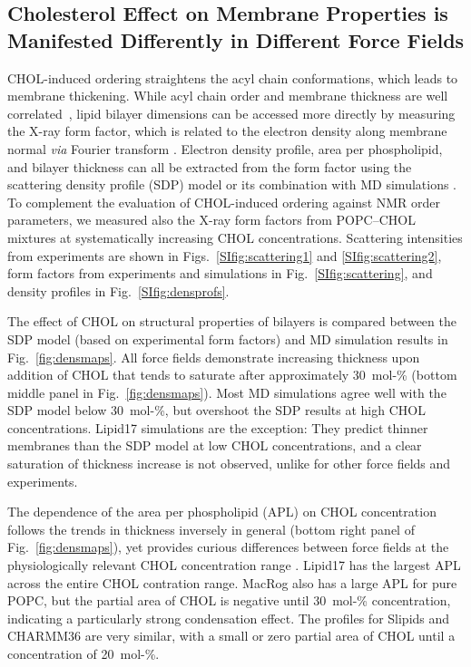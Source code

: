 \documentclass[journal=jctcce]{achemso}
\begin{document}
\subsection{Cholesterol Effect on Membrane Properties is Manifested Differently in Different Force Fields}

CHOL-induced ordering straightens the acyl chain conformations, which leads to membrane thickening. While acyl chain order and membrane thickness are well correlated~\cite{NMRlipidsDatabank}, lipid bilayer dimensions can be accessed more directly by measuring the X-ray form factor, which is related to the electron density along membrane normal \textit{via} Fourier transform \cite{pan12,Heftberger15,Marquardt15,ollila16}. Electron density profile, area per phospholipid, and bilayer thickness can all be extracted from the form factor using the scattering density profile (SDP) model or its combination with MD simulations  \cite{Kucerka08a,pan12,Heftberger15,Marquardt15,doktorova2020molecular}. To complement the evaluation of CHOL-induced ordering against NMR order parameters, we measured also the X-ray form factors from POPC--CHOL mixtures at systematically increasing CHOL concentrations. Scattering intensities from experiments are shown in Figs.~\ref{SIfig:scattering1} and \ref{SIfig:scattering2}, form factors from experiments and simulations in Fig.~\ref{SIfig:scattering}, and density profiles in Fig.~\ref{SIfig:densprofs}.


The effect of CHOL on structural properties of bilayers is compared between the SDP model (based on experimental form factors) and MD simulation results in Fig.~\ref{fig:densmaps}.  All force fields demonstrate increasing thickness upon addition of CHOL that tends to saturate after approximately 30~mol-\% (bottom middle panel in Fig.~\ref{fig:densmaps}). Most MD simulations agree well with the SDP model below 30~mol-\%, but overshoot the SDP results at high CHOL concentrations. Lipid17 simulations are the exception: They predict thinner membranes than the SDP model at low CHOL concentrations, and a clear saturation of thickness increase is not observed, unlike for other force fields and experiments.

The dependence of the area per phospholipid (APL) on CHOL concentration follows the trends in thickness inversely in general (bottom right panel of Fig.~\ref{fig:densmaps}), yet provides curious differences between force fields at the physiologically relevant CHOL concentration range \cite{van2008membrane}. Lipid17 has the largest APL across the entire CHOL contration range. MacRog also has a large APL for pure POPC, but the partial area of CHOL is negative until 30~mol-\% concentration, indicating a particularly strong condensation effect. The profiles for Slipids and CHARMM36 are very similar, with a small or zero partial area of CHOL until a concentration of 20~mol-\%. 
\end{document}

